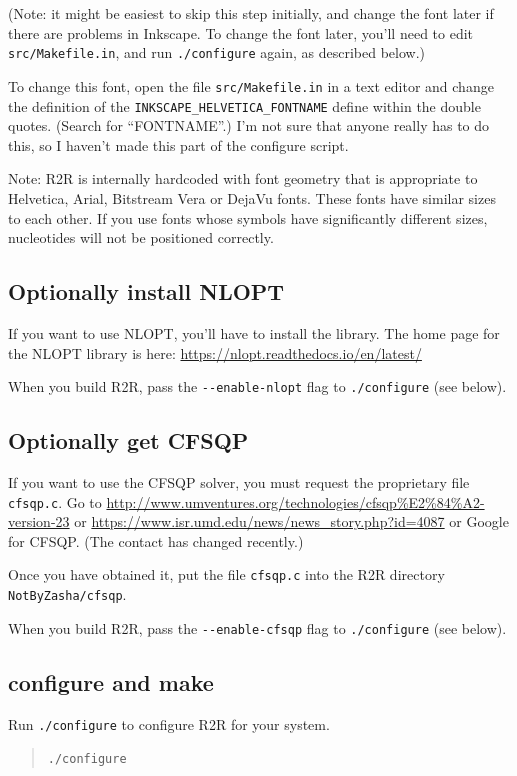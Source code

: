 \documentclass[letterpaper,12pt]{report}
\begin{document}
(Note: it might be easiest to skip this step initially, and change the font later if there are problems in Inkscape.  To change the font later, you'll need to edit {\tt src/Makefile.in}, and run {\tt ./configure} again, as described below.)

To change this font, open the file {\tt src/Makefile.in} in a text editor and change the definition of the {\tt INKSCAPE\_HELVETICA\_FONTNAME} define within the double quotes.  (Search for ``FONTNAME''.)  I'm not sure that anyone really has to do this, so I haven't made this part of the configure script.

Note: R2R is internally hardcoded with font geometry that is appropriate to Helvetica, Arial, Bitstream Vera or DejaVu fonts.  These fonts have similar sizes to each other.  If you use fonts whose symbols have significantly different sizes, nucleotides will not be positioned correctly.

\subsection{Optionally install NLOPT}

If you want to use NLOPT, you'll have to install the library.  The home page for the NLOPT library is here:
\url{https://nlopt.readthedocs.io/en/latest/}

When you build R2R, pass the {\tt -{}-enable-nlopt} flag to {\tt ./configure} (see below).

\subsection{Optionally get CFSQP}

If you want to use the CFSQP solver, you must request the 
proprietary file {\tt cfsqp.c}.  Go to \url{http://www.umventures.org/technologies/cfsqp\%E2\%84\%A2-version-23} or \url{https://www.isr.umd.edu/news/news_story.php?id=4087} or Google for
CFSQP.  (The contact has changed recently.)

Once you have obtained it, put the file {\tt cfsqp.c} into the R2R directory {\tt NotByZasha/cfsqp}.

When you build R2R, pass the {\tt -{}-enable-cfsqp} flag to {\tt ./configure} (see below).

\subsection{configure and make}

Run {\tt ./configure} to configure R2R for your system.
\begin{quote}
{\tt ./configure}
\end{quote}
\end{document}
